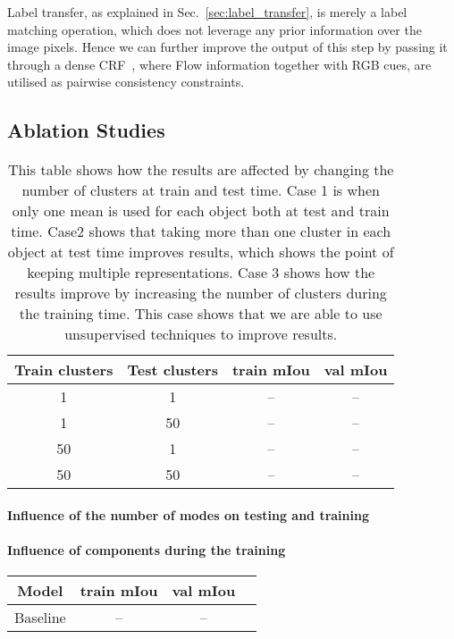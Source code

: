 \documentclass[10pt,twocolumn,letterpaper]{article}
\begin{document}
Label transfer, as explained in Sec.~\ref{sec:label_transfer}, is merely a label
matching operation, which does not leverage any prior information over the image
pixels. Hence we can further improve the output of this step by passing it
through a dense CRF~\cite{densecrf}, where Flow information together with RGB
cues, are utilised as pairwise consistency constraints.
\vspace{-5pt}\fi\subsection{Ablation Studies}\begin{table}[t]
    \centering
    \small
    \begin{tabular}{c|c|c|c}
    \hline
    Train clusters & Test clusters & train mIou & val mIou \\ \hline
    \hline
    1  & 1  & -- & -- \\
    1  & 50 & -- & -- \\
    50 & 1  & -- & -- \\
    50 & 50 & -- & -- \\
    \hline
    \end{tabular}
    \caption{This table shows how the results are affected by changing the number of clusters at train and test time. Case 1 is when only one mean is used for each object both at test and train time. Case2 shows that taking more than one cluster in each object at test time improves results, which shows the point of keeping multiple representations. Case 3 shows how the results improve by increasing the number of clusters during the training time. This case shows that we are able to use unsupervised techniques to improve results.}
    \label{tab:unsup_training}
\end{table}\paragraph{Influence of the number of modes on testing and training}\paragraph{Influence of components during the training}\begin{table}[t]
    \centering
    \small
    \begin{tabular}{|c|c|c|c|}
    \hline
    Model                   & train mIou    & val mIou \\ \hline
    \hline
    Baseline                & --            & --  \\

\end{tabular}
\end{table}
\end{document}
